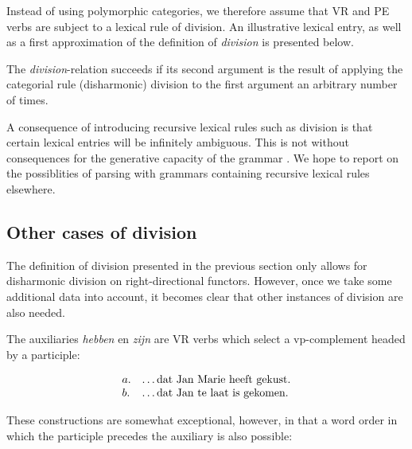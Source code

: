 Instead of using polymorphic categories, we therefore assume that VR and PE 
verbs
are subject to a lexical rule of division.  An illustrative lexical entry, as 
well
as a first approximation of the definition of {\em division} is presented below.

\pr
\pred
{}
\epred
\pred
{}
\epred
\epr
The {\em division}-relation succeeds if its second argument is the result of 
applying the categorial rule (disharmonic) division to the first argument 
an arbitrary number of times. 

A consequence of introducing recursive lexical rules such as division is that 
certain lexical entries will be infinitely ambiguous. This is not without 
consequences 
for the generative capacity of the grammar \cite{carpenter-lexical}. We hope to 
report 
on the possiblities of parsing with grammars containing recursive lexical rules 
elsewhere.

\subsection{Other cases of division}

The definition of division presented in the previous section only allows for
disharmonic division on right-directional functors.  However, once we take some
additional data into account, it becomes clear that other instances of division are
also needed.

The auxiliaries {\em hebben} en {\em zijn} are VR verbs which select a {\sc 
vp}-complement headed by a participle:

\begin{equation}
\begin{array}[t]{ll}
a. & \ldots\mbox{dat Jan Marie heeft gekust.} \\
b. & \ldots\mbox{dat Jan te laat is gekomen}.
\end{array}
\end{equation}
 
These constructions are somewhat exceptional, however, in that a word order in 
which the participle precedes the auxiliary is also possible:

